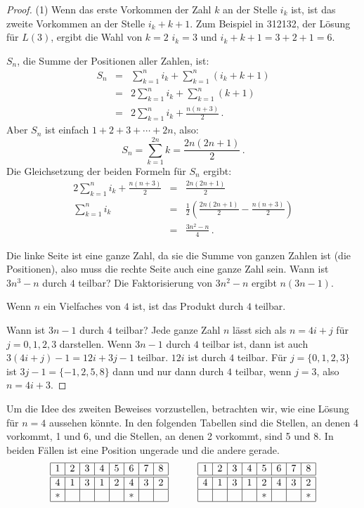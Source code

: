 \begin{proof}
(1) Wenn das erste Vorkommen der Zahl $k$ an der Stelle $i_k$ ist, ist das zweite Vorkommen an der Stelle $i_k+k+1$. Zum Beispiel in 3{}1{}2{}1{}3{}2, der Lösung für $L(3)$, ergibt die Wahl von $k=2$ $i_k=3$ und $i_k+k+1=3+2+1=6$.

$S_n$, die Summe der Positionen aller Zahlen, ist:
\begin{eqnarray*}
S_n&=&\sum_{k=1}^{n}i_k+\sum_{k=1}^{n}(i_k+k+1)\\
& =& 2\sum_{k=1}^{n}i_k+\sum_{k=1}^{n}(k+1)\\
&=& 2\sum_{k=1}^{n}i_k+\frac{n(n+3)}{2}\,.
\end{eqnarray*}
Aber $S_n$ ist einfach $1+2+3+\cdots+2n$, also:
\[
S_n=\sum_{k=1}^{2n}k = \frac{2n(2n+1)}{2}\,.
\]
Die Gleichsetzung der beiden Formeln für $S_n$ ergibt:
\begin{eqnarray*}
2\sum_{k=1}^{n}i_k+\frac{n(n+3)}{2} &=& \frac{2n(2n+1)}{2}\\
\sum_{k=1}^{n}i_k &=& \frac{1}{2}\left(\frac{2n(2n+1)}{2} - \frac{n(n+3)}{2}\right) \\
&=& \frac{3n^2-n}{4}\,.
\end{eqnarray*}

Die linke Seite ist eine ganze Zahl, da sie die Summe von ganzen Zahlen ist (die Positionen), also muss die rechte Seite auch eine ganze Zahl sein. Wann ist $3n^3-n$ durch $4$ teilbar? Die Faktorisierung von $3n^2-n$ ergibt $n(3n-1)$.

Wenn $n$ ein Vielfaches von $4$ ist, ist das Produkt durch $4$ teilbar.

Wann ist $3n-1$ durch $4$ teilbar? Jede ganze Zahl $n$ lässt sich als $n=4i+j$ für $j=0,1,2,3$ darstellen. Wenn $3n-1$ durch $4$ teilbar ist, dann ist auch $3(4i+j)-1 = 12i+3j-1$ teilbar. $12i$ ist durch $4$ teilbar. Für $j=\{0,1,2,3\}$ ist $3j-1=\{-1,2,5,8\}$ dann und nur dann durch $4$ teilbar, wenn $j=3$, also $n=4i+3$.
\end{proof}
Um die Idee des zweiten Beweises vorzustellen, betrachten wir, wie eine Lösung für $n=4$ aussehen könnte. In den folgenden Tabellen sind die Stellen, an denen 4 vorkommt, 1 und 6, und die Stellen, an denen 2 vorkommt, sind 5 und 8. In beiden Fällen ist eine Position ungerade und die andere gerade. 
\[
\begin{array}{|c|c|c|c|c|c|c|c|}
\hline
1&2&3&4&5&6&7&8\\
\hline\hline
4&1&3&1&2&4&3&2\\\hline
*&&&&&*&&\\\hline
\end{array}
\hspace{3em}
\begin{array}{|c|c|c|c|c|c|c|c|}
\hline
1&2&3&4&5&6&7&8\\
\hline\hline
4&1&3&1&2&4&3&2\\\hline
&&&&*&&&*\\\hline
\end{array}
\]
